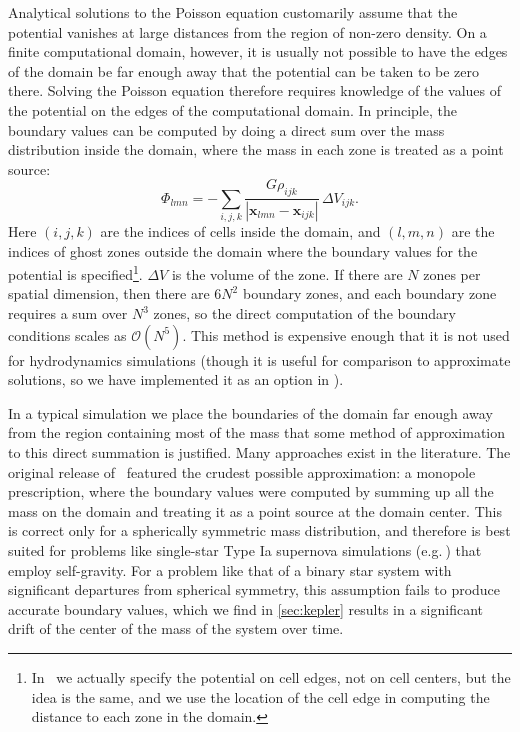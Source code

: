 \documentclass[12pt]{article}
\begin{document}
Analytical solutions to the Poisson equation customarily assume that the
potential vanishes at large distances from the region of non-zero
density. On a finite computational domain, however, it is usually not
possible to have the edges of the domain be far enough away that the
potential can be taken to be zero there. Solving the Poisson equation
therefore requires knowledge of the values of the potential on the
edges of the computational domain. In principle, the boundary values can be computed
by doing a direct sum over the mass distribution inside the domain,
where the mass in each zone is treated as a point source:
\begin{equation}
  \Phi_{{lmn}} = -\sum_{{i, j, k}} \frac{G \rho_{{ijk}}}{|\mathbf{x}_{{lmn}} - \mathbf{x}_{{ijk}}|}\, \Delta V_{{ijk}}.\label{eq:direct_sum}
\end{equation}
Here $(i, j, k)$ are the indices of cells inside the domain, and $(l,m, n)$ 
are the indices of ghost zones outside the domain where the boundary values for the potential is specified\footnote{In \castro\ we actually
specify the potential on cell edges, not on cell centers, but the idea is the same, and we use the location of
the cell edge in computing the distance to each zone in the domain.}. $\Delta V$ is the volume of the
zone. If there are $N$ zones per spatial dimension, then there are
$6 N^2$ boundary zones, and each boundary zone requires a sum over
$N^3$ zones, so the direct computation of the boundary conditions
scales as $\mathcal{O}(N^5)$.  This method is expensive enough that it is not used
for hydrodynamics simulations (though it is useful for comparison to
approximate solutions, so we have implemented it as an option in \castro).

In a typical simulation we place the boundaries of the domain far
enough away from the region containing most of the mass that some
method of approximation to this direct summation is justified. Many
approaches exist in the literature. The original release of \castro\
featured the crudest possible approximation: a monopole prescription,
where the boundary values were computed by summing up all the mass on
the domain and treating it as a point source at the domain
center. This is correct only for a spherically symmetric mass
distribution, and therefore is best suited for problems like
single-star Type Ia supernova simulations (e.g.$\ $\cite{malone:2014})
that employ self-gravity. For a problem like that of a binary star system
with significant departures from spherical symmetry, this assumption
fails to produce accurate boundary values, which we find in \autoref{sec:kepler}
results in a significant drift of the center of the mass of the system over time.
\end{document}
